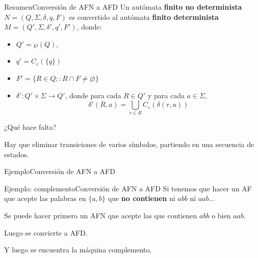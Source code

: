 \documentclass[spanish,handout]{beamer}
\begin{document}
  \begin{frame}{Resumen}{Conversión de AFN a AFD}
      Un autómata \textbf{finito no determinista} $N = (Q, \Sigma, \delta, q, F)$ es convertido al autómata \textbf{finito determinista} $M = (Q', \Sigma, \delta', q', F')$, donde: \pause
      
      \bigskip

      \begin{itemize}
        \itemsep1.5ex
        \item $Q' = \wp(Q)$, \pause
        \item $q'= C_\varepsilon(\{q\})$ \pause
        \item $F' = \{R \in Q; : R \cap F \neq \varnothing\}$ \pause
        \item $\delta' : Q' \times \Sigma \to Q'$, donde para cada $R \in Q'$ y para cada $a \in \Sigma$,
        \[\delta'(R,a) = \bigcup_{r \in R} C_\varepsilon (\delta (r,a))\]
      \end{itemize} \pause

      \bigskip

      ¿Qué hace falta? \pause

      Hay que eliminar transiciones de varios símbolos, partiendo en una secuencia de estados.

  \end{frame}

  \begin{frame}{Ejemplo}{Conversión de AFN a AFD}
    \begin{center}
    \end{center}      
  \end{frame}

  \begin{frame}{Ejemplo: complemento}{Conversión de AFN a AFD}
      Si tenemos que hacer un AF que acepte las palabras en $\{a,b\}$ que \textbf{no contienen} ni $abb$ ni $aab$... \pause

      \bigskip

      Se puede hacer primero un AFN que acepte las que contienen $abb$ o bien $aab$. \pause

      \bigskip

      Luego se convierte a AFD. \pause

      \bigskip

      Y luego se encuentra la máquina complemento.
  \end{frame}
\end{document}
